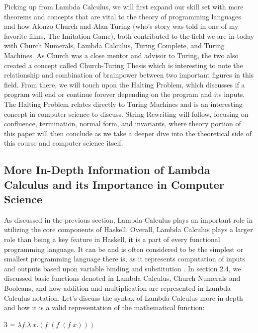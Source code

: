 \documentclass{article}
\begin{document}
\medskip\noindent
Picking up from Lambda Calculus, we will first expand our skill set with more theorems and concepts that are vital to the theory of programming languages and how Alonzo Church and Alan Turing (who's story was told in one of my favorite films, The Imitation Game), both contributed to the field we are in today with Church Numerals, Lambda Calculus, Turing Complete, and Turing Machines. As Church was a close mentor and advisor to Turing, the two also created a concept called Church-Turing Thesis which is interesting to note the relationship and combination of brainpower between two important figures in this field. From there, we will touch upon the Halting Problem, which discusses if a program will end or continue forever depending on the program and its inputs. The Halting Problem relates directly to Turing Machines and is an interesting concept in computer science to discuss. String Rewriting will follow, focusing on confluence, termination, normal form, and invariants, where theory portion of this paper will then conclude as we take a deeper dive into the theoretical side of this course and computer science itself.

\subsection{More In-Depth Information of Lambda Calculus and its Importance in Computer Science}

As discussed in the previous section, Lambda Calculus plays an important role in utilizing the core components of Haskell. Overall, Lambda Calculus plays a larger role than being a key feature in Haskell, it is a part of every functional programming language. It can be and is often considered to be the simplest or smallest programming language there is, as it represents computation of inputs and outputs based upon variable binding and substitution \cite{JRebel}. In section 2.4, we discussed basic functions denoted in Lambda Calculus, Church Numerals and Booleans, and how addition and multiplication are represented in Lambda Calculus notation. Let's discuss the syntax of Lambda Calculus more in-depth and how it is a valid representation of the mathematical function:

\begin{center}
 3 = $\lambda f. \lambda\ x.(f \; (f \; (f \; x)))$ \\
\end{center}
\end{document}
